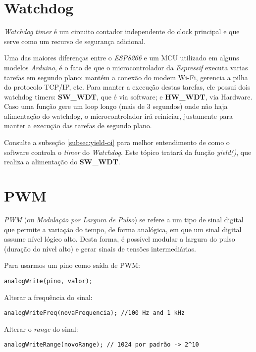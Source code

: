 \documentclass[
	11pt,				%
	openright,			%
	twoside,			%
	a5paper,			%
	english,			%
	french,				%
	spanish,			%
	brazil,				%
	sumario=tradicional
]{abntex2}
\begin{document}
\section{Watchdog}
\textit{Watchdog timer} é um circuito contador independente do clock principal e que serve como um recurso de segurança adicional.

Uma das maiores diferenças entre o \textit{ESP8266} e um MCU utilizado em alguns modelos \textit{Arduino}, é o fato de que o microcontrolador da \textit{Espressif} executa varias tarefas em segundo plano: mantém a conexão do modem Wi-Fi, gerencia a pilha do protocolo TCP/IP, etc. Para manter a execução destas tarefas, ele possui dois watchdog timers: \textbf{\textsf{SW\_WDT}}, que é via software; e \textbf{\textsf{HW\_WDT}}, via Hardware. Caso uma função gere um loop longo (mais de 3 segundos) onde não haja alimentação do watchdog, o microcontrolador irá reiniciar, justamente para manter a execução das tarefas de segundo plano.

Consulte a subseção \ref{subsec:yield-oi} para melhor entendimento de como o software controla o \textit{timer} do \textit{Watchdog}. Este tópico tratará da função \emph{yield()}, que realiza a alimentação do \textbf{\textsf{SW\_WDT}}.

\section{PWM}

\textit{PWM} (ou \textit{Modulação por Largura de Pulso}) se refere a um tipo de sinal digital que permite a variação do tempo, de forma analógica, em que um sinal digital assume nível lógico alto. Desta forma, é possível modular a largura do pulso (duração do nível alto) e gerar sinais de tensões intermediárias. 
           \begin{tcolorbox}[colbacktitle=green!50!white!60,
title={\vspace{-13pt}\texttt{[image: notebook.png]} \hspace{2pt} \textsf{\textbf{Na Prática...}\vspace{4pt}}},coltitle=black, colback=white,arc=4mm, outer arc=3.5mm]
\raggedright
Para usarmos um pino como saída de PWM:
\begin{lstlisting}
analogWrite(pino, valor); 
\end{lstlisting}
Alterar a frequência do sinal:
\begin{lstlisting}
analogWriteFreq(novaFrequencia); //100 Hz and 1 kHz
\end{lstlisting}
Alterar o \textit{range} do sinal:
\begin{lstlisting}
analogWriteRange(novoRange); // 1024 por padrão -> 2^10
\end{lstlisting}

\end{tcolorbox}
\end{document}

